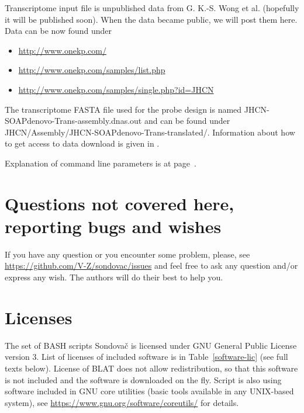 \documentclass[a4paper, 11pt, twoside]{article}
\begin{document}
Transcriptome input file is unpublished data from G. K.-S. Wong et al. (hopefully it will be published soon). When the data became public, we will post them here. Data can be now found under

\begin{itemize}
  \item \href{http://www.onekp.com/}{http://www.onekp.com/}
  \item \href{http://www.onekp.com/samples/list.php}{http://www.onekp.com/samples/list.php}
  \item \href{http://www.onekp.com/samples/single.php?id=JHCN}{http://www.onekp.com/samples/single.php?id=JHCN}
\end{itemize}

The transcriptome FASTA file used for the probe design is named JHCN-SOAPdenovo-Trans-assembly.dnas.out and can be found under JHCN/Assembly/JHCN-SOAPdenovo-Trans-translated/. Information about how to get access to data download is given in \citet{Matasci2014}.

Explanation of command line parameters is at page~\pageref{script-usage}.

\section{Questions not covered here, reporting bugs and wishes}

If you have any question or you encounter some problem, please, see \href{https://github.com/V-Z/sondovac/issues}{https://github.com/V-Z/sondovac/issues} and feel free to ask any question and/or express any wish. The authors will do their best to help you.

\section{Licenses}

The set of BASH scripts Sondovač is licensed under GNU General Public License version 3. List of licenses of included software is in Table~\ref{software-lic} (see full texts below). License of BLAT does not allow redistribution, so that this software is not included and the software is downloaded on the fly. Script is also using software included in GNU core utilities (basic tools available in any UNIX-based system), see \href{https://www.gnu.org/software/coreutils/}{https://www.gnu.org/software/coreutils/} for details.
\end{document}
